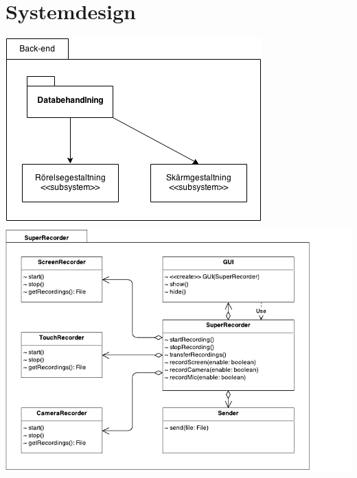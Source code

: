 \section{Systemdesign}
\label{sec:system_design}

\includegraphics[scale=0.8]{backendorganizational.png}
\includegraphics[scale=1.0]{CrudeClassDiagram.pdf}




